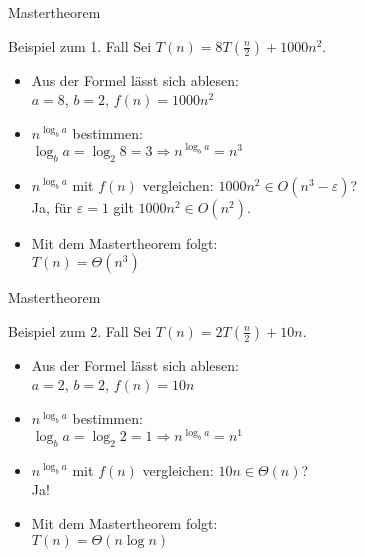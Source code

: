 \begin{frame}{Mastertheorem}
    \begin{exampleblock}{Beispiel zum 1. Fall}
    	Sei $T(n) = 8 T \left(\frac{n}{2} \right) + 1000n^2$.
    	\begin{itemize}
    		\item Aus der Formel lässt sich ablesen:\\
    			$a=8$, $b=2$, $f(n)=1000n^2$
    		\item $n^{\log_b a}$ bestimmen:\\
    			$\log_b a = \log_2 8 = 3 \Rightarrow n^{\log_b a} = n^3$
    		\item $n^{\log_b a}$ mit $f(n)$ vergleichen: $1000n^2 \in O(n^3-\varepsilon)$?\\
    			Ja, für $\varepsilon = 1$ gilt $1000n^2 \in O(n^2)$.
    		\item Mit dem Mastertheorem folgt:\\
    			$T(n) = \Theta(n^3)$
    	\end{itemize}
    \end{exampleblock}
\end{frame}


\begin{frame}{Mastertheorem}
    \begin{exampleblock}{Beispiel zum 2. Fall}
    	Sei $T(n) = 2 T \left(\frac{n}{2} \right) + 10n$.
    	\begin{itemize}
    		\item Aus der Formel lässt sich ablesen:\\
    			$a=2$, $b=2$, $f(n)=10n$
    		\item $n^{\log_b a}$ bestimmen:\\
    			$\log_b a = \log_2 2 = 1 \Rightarrow n^{\log_b a} = n^1$
    		\item $n^{\log_b a}$ mit $f(n)$ vergleichen: $10n \in \Theta(n)$?\\
    			Ja!
    		\item Mit dem Mastertheorem folgt:\\
    			$T(n) = \Theta(n \log n)$
    	\end{itemize}
    \end{exampleblock}
\end{frame}



